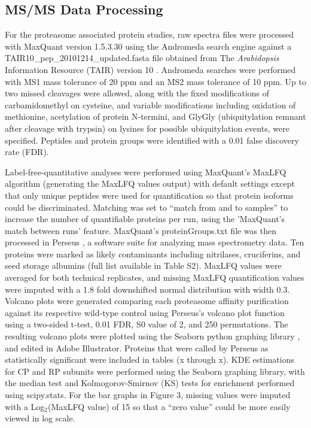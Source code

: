 \subsection{MS/MS Data Processing}
For the proteasome associated protein studies, raw spectra files were processed with MaxQuant version 1.5.3.30 \citep{cox08} using the Andromeda search engine against a TAIR10\_pep\_20101214\_updated.fasta file obtained from The \textit{Arabidopsis} Information Resource (TAIR) version 10 \citep{berardini15}. Andromeda searches were performed with MS1 mass tolerance of 20 ppm and an MS2 mass tolerance of 10 ppm. Up to two missed cleavages were allowed, along with the fixed modifications of carbamidomethyl on cysteine, and variable modifications including oxidation of methionine, acetylation of protein N-termini, and GlyGly (ubiquitylation remnant after cleavage with trypsin) on lysines for possible ubiquitylation events, were specified. Peptides and protein groups were identified with a 0.01 false discovery rate (FDR).
 
Label-free-quantitative analyses were performed using MaxQuant’s MaxLFQ \citep{cox14} algorithm (generating the MaxLFQ values output) with default settings except that only unique peptides were used for quantification so that protein isoforms could be discriminated.  Matching was set to “match from and to samples” to increase the number of quantifiable proteins per run, using the 'MaxQuant’s match between runs' feature. MaxQuant’s proteinGroups.txt file was then processed in Perseus \citep{tyanova16}, a software suite for analyzing mass spectrometry data. Ten proteins were marked as likely contaminants including nitrilases, cruciferins, and seed storage albumins (full list available in Table S2). MaxLFQ values were averaged for both technical replicates, and missing MaxLFQ quantification values were imputed with a 1.8 fold downshifted normal distribution with width 0.3. Volcano plots were generated comparing each proteasome affinity purification against its respective wild-type control using Perseus's volcano plot function using a two-sided t-test, 0.01 FDR, S0 value of 2, and 250 permutations. The resulting volcano plots were plotted using the Seaborn python graphing library \citep{tyanova16, waskom16}, and edited in Adobe Illustrator. Proteins that were called by Perseus as statistically significant were included in tables (x through x). KDE estimations for CP and RP subunits were performed using the Seaborn graphing library, with the median test and Kolmogorov-Smirnov (KS) tests for enrichment performed using scipy.stats. For the bar graphs in Figure 3, missing values were imputed with a Log$_{2}$(MaxLFQ value) of 15 so that a ``zero value'' could be more easily viewed in log scale.

